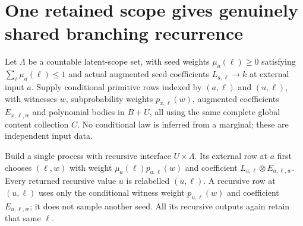 \documentclass[11pt]{article}
\begin{document}
\section{One retained scope gives genuinely shared branching recurrence}
Let $\Lambda$ be a countable latent-scope set, with seed weights $\mu_a(\ell)\geq0$ satisfying $\sum_\ell\mu_a(\ell)\leq1$ and actual augmented seed coefficients $L_{a,\ell}\to k$ at external input $a$. Supply conditional primitive rows indexed by $(a,\ell)$ and $(u,\ell)$, with witnesses $w$, subprobability weights $p_{x,\ell}(w)$, augmented coefficients $E_{x,\ell,w}$ and polynomial bodies in $B+U$, all using the same complete global content collection $C$. No conditional law is inferred from a marginal; these are independent input data.

Build a single process with recursive interface $U\times\Lambda$. Its external row at $a$ first chooses $(\ell,w)$ with weight $\mu_a(\ell)p_{a,\ell}(w)$ and coefficient $L_{a,\ell}\otimes E_{a,\ell,w}$. Every returned recursive value $u$ is relabelled $(u,\ell)$. A recursive row at $(u,\ell)$ uses only the conditional witness weight $p_{u,\ell}(w)$ and coefficient $E_{u,\ell,w}$; it does not sample another seed. All its recursive outputs again retain that same $\ell$.
\end{document}
